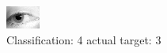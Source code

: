 \begin{figure}[h!]
\begin{center}
\includegraphics[width=0.60\columnwidth]{figures/ID1407_class_4_target_3.png}
\end{center}
\caption{ Classification: 4 actual target: 3}
\label{fig:ID1407_class_4_target_3}
\end{figure}
